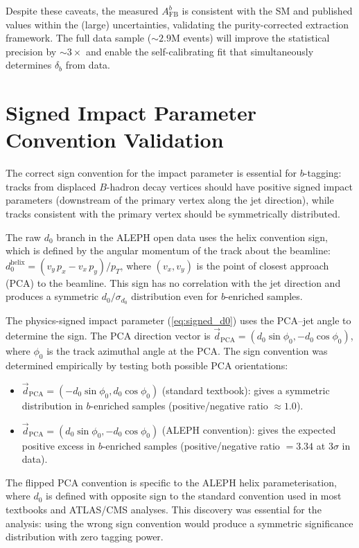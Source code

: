 \documentclass[11pt,a4paper]{article}
\begin{document}
Despite these caveats, the measured $A_\text{FB}^b$ is consistent
with the SM and published values within the (large) uncertainties,
validating the purity-corrected extraction framework.
The full data sample (${\sim}2.9$M events) will improve the statistical
precision by $\sim 3\times$ and enable the self-calibrating fit
that simultaneously determines $\delta_b$ from data.

\section{Signed Impact Parameter Convention Validation}
\label{app:d0_sign_detail}

The correct sign convention for the impact parameter is essential
for $b$-tagging: tracks from displaced $B$-hadron decay vertices
should have positive signed impact parameters (downstream of the
primary vertex along the jet direction), while tracks consistent
with the primary vertex should be symmetrically distributed.

The raw $d_0$ branch in the ALEPH open data uses the helix
convention sign, which is defined by the angular momentum of the
track about the beamline:
$d_0^\text{helix} = (v_y\,p_x - v_x\,p_y) / p_T$, where
$(v_x, v_y)$ is the point of closest approach (PCA) to the
beamline.
This sign has no correlation with the jet direction and produces
a symmetric $d_0/\sigma_{d_0}$ distribution even for $b$-enriched
samples.

The physics-signed impact parameter (\cref{eq:signed_d0}) uses the
PCA--jet angle to determine the sign.
The PCA direction vector is
$\vec{d}_\text{PCA} = (d_0\sin\phi_0, -d_0\cos\phi_0)$, where
$\phi_0$ is the track azimuthal angle at the PCA.
The sign convention was determined empirically by testing both
possible PCA orientations:
\begin{itemize}
\item $\vec{d}_\text{PCA} = (-d_0\sin\phi_0, d_0\cos\phi_0)$
  (standard textbook): gives a symmetric distribution in
  $b$-enriched samples (positive/negative ratio $\approx 1.0$).
\item $\vec{d}_\text{PCA} = (d_0\sin\phi_0, -d_0\cos\phi_0)$
  (ALEPH convention): gives the expected positive excess in
  $b$-enriched samples (positive/negative ratio $= 3.34$ at
  $3\sigma$ in data).
\end{itemize}

The flipped PCA convention is specific to the ALEPH helix
parameterisation, where $d_0$ is defined with opposite sign
to the standard convention used in most textbooks and ATLAS/CMS
analyses.
This discovery was essential for the analysis: using the wrong
sign convention would produce a symmetric significance
distribution with zero tagging power.
\end{document}
